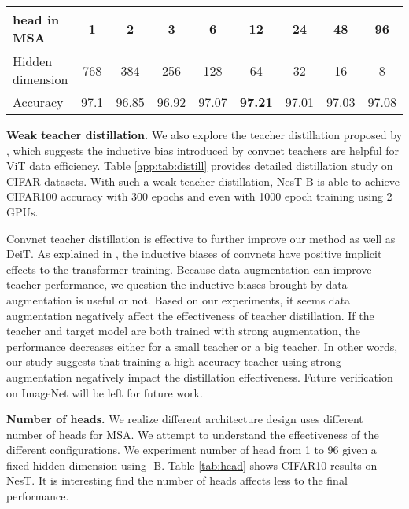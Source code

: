 \documentclass{article}
\newcommand{\topic}[1]{\noindent \textbf{#1}}
\newcommand{\OURS}{NesT\xspace}
\begin{document}
\begin{table*}[h]
    \centering
     \caption{Study the impact of number of heads in MSA on the CIFAR10 dataset with -B. When head=96, the hidden dimension used for computing Attention is only 8. However, it can still lead to similar accuracy.} \label{tab:head}
    \begin{tabular}{l|cccccccc}
    \toprule
    head  in MSA   & 1 & 2   &	3	& 6 	& 12  &	 24 &	48 &	96 \\ \midrule      
    Hidden dimension     & 768 &	384	 &256 &	128	& 64 &	32&	16	&8 \\     \midrule
    Accuracy & 97.1 &	96.85&	96.92&	97.07  &	\textbf{97.21}&	97.01&	97.03&	97.08 \\ \bottomrule
    \end{tabular}
    \vspace{2pt}
   
\end{table*}


\topic{Weak teacher distillation.} 
We also explore the teacher distillation proposed by \cite{touvron2020training}, which suggests the inductive bias introduced by convnet teachers are helpful for ViT data efficiency. 
Table \ref{app:tab:distill} provides detailed distillation study on CIFAR datasets. With such a weak teacher distillation, \OURS-B is able to achieve  CIFAR100 accuracy with 300 epochs and even  with 1000 epoch training using 2 GPUs.

Convnet teacher distillation \cite{touvron2020training} is effective to further improve our method as well as DeiT. As explained in \cite{touvron2020training}, the inductive biases of convnets have positive implicit effects to the transformer training. 
Because data augmentation can improve teacher performance, we question the inductive biases brought by data augmentation is useful or not. Based on our experiments, it seems data augmentation negatively affect the effectiveness of teacher distillation. 
If the teacher and target model are both trained with strong augmentation, the performance decreases either for a small teacher or a big teacher.
In other words, our study suggests that training a high accuracy teacher using strong augmentation negatively impact the distillation effectiveness. Future verification on ImageNet will be left for future work.


\topic{Number of heads.} We realize different architecture design uses different number of heads for MSA. 
We attempt to understand the effectiveness of the different configurations. 
We experiment number of head from 1 to 96 given a fixed  hidden dimension using -B.
Table \ref{tab:head} shows CIFAR10 results on \OURS. It is interesting find the number of heads affects less to the final performance. 
\end{document}
